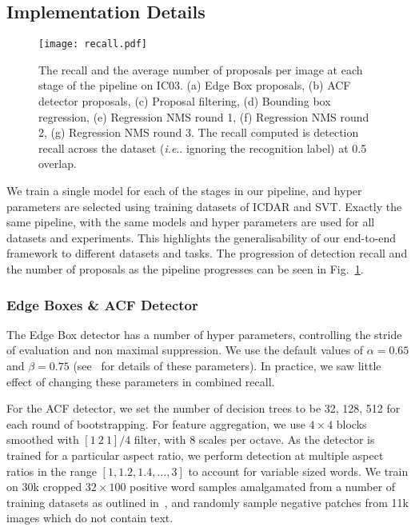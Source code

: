 \documentclass[twocolumn]{svjour3}          \smartqed  \usepackage{epsfig}
\makeatletter
\DeclareRobustCommand\onedot{\futurelet\@let@token\@onedot}
\def\@onedot{\ifx\@let@token.\else.\null\fi\xspace}
\def\ie{\emph{i.e}\onedot} \def\Ie{\emph{I.e}\onedot}
\makeatother
\begin{document}
\subsection{Implementation Details}
\label{sec:implementation}

\begin{figure}
\begin{center}
\texttt{[image: recall.pdf]} 
\caption{The recall and the average number of proposals per image at each stage of the pipeline on IC03. (a) Edge Box proposals, (b) ACF detector proposals, (c) Proposal filtering, (d) Bounding box regression, (e) Regression NMS round 1, (f) Regression NMS round 2, (g) Regression NMS round 3. The recall computed is detection recall across the dataset (\ie ignoring the recognition label) at 0.5 overlap.}
\label{fig:recall}
\end{center}
\end{figure}

We train a single model for each of the stages in our pipeline, and hyper parameters are selected using training datasets of ICDAR and SVT. Exactly the same pipeline, with the same models and hyper parameters are used for all datasets and experiments. This highlights the generalisability of our end-to-end framework to different datasets and tasks. The progression of detection recall and the number of proposals as the pipeline progresses can be seen in Fig.~\ref{fig:recall}.

\subsubsection{Edge Boxes \& ACF Detector}

The Edge Box detector has a number of hyper parameters, controlling the stride of evaluation and non maximal suppression. We use the default values of $\alpha=0.65$ and $\beta=0.75$ (see~\cite{Zitnick14} for details of these parameters). In practice, we saw little effect of changing these parameters in combined recall.

For the ACF detector, we set the number of decision trees to be 32, 128, 512 for each round of bootstrapping. For feature aggregation, we use $4 \times 4$ blocks smoothed with $[1~2~1]/4$ filter, with 8 scales per octave. As the detector is trained for a particular aspect ratio, we perform detection at multiple aspect ratios in the range $[1,1.2,1.4,\ldots,3]$ to account for variable sized words. We train on 30k cropped $32 \times 100$ positive word samples amalgamated from a number of training datasets as outlined in~\cite{Jaderberg14a}, and randomly sample negative patches from 11k images which do not contain text.
\end{document}
